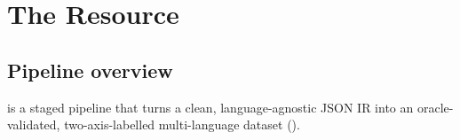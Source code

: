 
\section{The Resource}
\label{sec:resource}

\subsection{Pipeline overview}
\tool{} is a staged pipeline that turns a clean, language-agnostic JSON IR into an
oracle-validated, two-axis-labelled multi-language dataset ().

